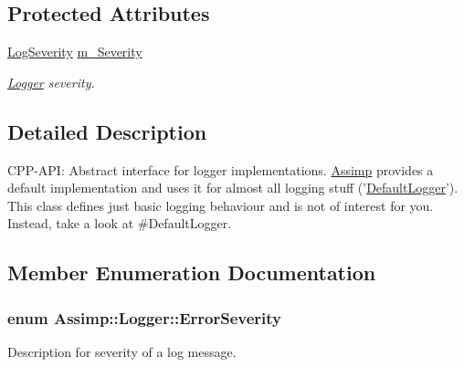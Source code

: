 \subsection*{Protected Attributes}
\begin{DoxyCompactItemize}
\item 
\hyperlink{class_assimp_1_1_logger_a8b6248a0fd062431e8572556350d29e6}{Log\-Severity} \hyperlink{class_assimp_1_1_logger_ae1c96711eb927a5b33745a6211e93f56}{m\-\_\-\-Severity}
\begin{DoxyCompactList}\small\item\em \hyperlink{class_assimp_1_1_logger}{Logger} severity. \end{DoxyCompactList}\end{DoxyCompactItemize}


\subsection{Detailed Description}
C\-P\-P-\/\-A\-P\-I\-: Abstract interface for logger implementations. \hyperlink{namespace_assimp}{Assimp} provides a default implementation and uses it for almost all logging stuff ('\hyperlink{class_assimp_1_1_default_logger}{Default\-Logger}'). This class defines just basic logging behaviour and is not of interest for you. Instead, take a look at \#\-Default\-Logger. 

\subsection{Member Enumeration Documentation}
\hypertarget{class_assimp_1_1_logger_acd0b52a87d6fc11e957ed2c6e2ad75b6}{
\subsubsection[{Error\-Severity}]{\setlength{\rightskip}{0pt plus 5cm}enum {\bf Assimp\-::\-Logger\-::\-Error\-Severity}}}\label{class_assimp_1_1_logger_acd0b52a87d6fc11e957ed2c6e2ad75b6}


Description for severity of a log message. 

